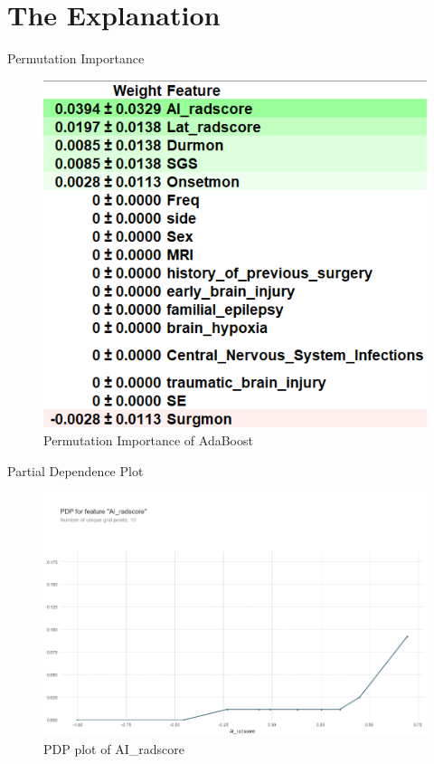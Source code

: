\documentclass[
  11pt,
  ignorenonframetext,
  fontset=fandol]{beamer}
\begin{document}
\hypertarget{the-explanation}{%
\section{The Explanation}\label{the-explanation}}

\begin{frame}{Permutation Importance}
\protect\hypertarget{permutation-importance}{}
\begin{figure}

{\centering \includegraphics[width=0.6\linewidth]{images/eli5} 

}

\caption{Permutation Importance of AdaBoost}\label{fig:unnamed-chunk-8}
\end{figure}
\end{frame}

\begin{frame}{Partial Dependence Plot}
\protect\hypertarget{partial-dependence-plot}{}
\begin{figure}

{\centering \includegraphics[width=0.8\linewidth]{images/PDP_ai} 

}

\caption{PDP plot of AI_radscore}\label{fig:unnamed-chunk-9}
\end{figure}
\end{frame}
\end{document}
